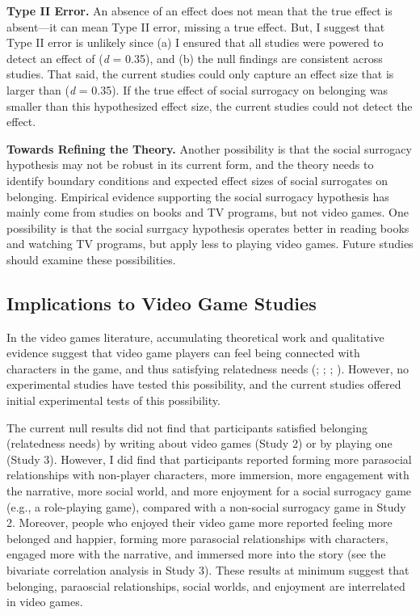 \documentclass[
]{udthesis}
\begin{document}
\textbf{Type II Error.} An absence of an effect does not mean that the true
effect is absent---it can mean Type II error, missing a true effect.
But, I suggest that Type II error is unlikely since (a) I ensured that
all studies were powered to detect an effect of (\emph{d} =
0.35), and (b) the null findings are consistent across
studies. That said, the current studies could only capture an effect
size that is larger than (\emph{d} = 0.35). If the true effect
of social surrogacy on belonging was smaller than this hypothesized
effect size, the current studies could not detect the effect.

\textbf{Towards Refining the Theory.} Another possibility is that the social
surrogacy hypothesis may not be robust in its current form, and the
theory needs to identify boundary conditions and expected effect sizes
of social surrogates on belonging. Empirical evidence supporting the
social surrogacy hypothesis has mainly come from studies on books and TV
programs, but not video games. One possibility is that the social
surrgacy hypothesis operates better in reading books and watching TV
programs, but apply less to playing video games. Future studies should
examine these possibilities.

\subsection{Implications to Video Game Studies}\label{implications-to-video-game-studies}

In the video games literature, accumulating theoretical work and
qualitative evidence suggest that video game players can feel being
connected with characters in the game, and thus satisfying relatedness
needs (; ; ; ). However, no
experimental studies have tested this possibility, and the current
studies offered initial experimental tests of this possibility.

The current null results did not find that participants satisfied
belonging (relatedness needs) by writing about video games (Study 2) or
by playing one (Study 3). However, I did find that participants reported
forming more parasocial relationships with non-player characters, more
immersion, more engagement with the narrative, more social world, and
more enjoyment for a social surrogacy game (e.g., a role-playing game),
compared with a non-social surrogacy game in Study 2. Moreover, people
who enjoyed their video game more reported feeling more belonged and
happier, forming more parasocial relationships with characters, engaged
more with the narrative, and immersed more into the story (see the
bivariate correlation analysis in Study 3). These results at minimum
suggest that belonging, paraoscial relationships, social worlds, and
enjoyment are interrelated in video games.
\end{document}
